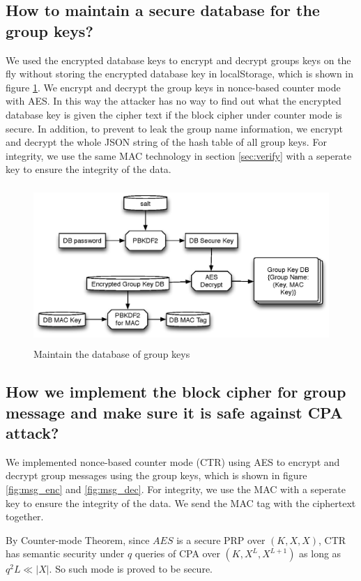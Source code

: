 \subsection{How to maintain a secure database for the group keys?}
We used the encrypted database keys to encrypt and decrypt groups keys on the fly without storing the encrypted database key in localStorage, which is shown in figure \ref{fig:db}. We encrypt and decrypt the group keys in nonce-based counter mode with AES.  In this way the attacker has no way to find out what the encrypted database key is given the cipher text if the block cipher under counter mode is secure. 
In addition, to prevent to leak the group name information, we encrypt and decrypt the whole JSON string of the hash table of all group keys. For integrity, we use the same MAC technology in section \ref{sec:verify} with a seperate key to ensure the integrity of the data.
\begin{figure}[h!]
\centering
\caption{Maintain the database of group keys}
\label{fig:db}
\includegraphics[height=6cm]{fig/db.eps}
\end{figure}

\subsection{How we implement the block cipher for group message and make sure it is safe against CPA attack?}
We implemented nonce-based counter mode (CTR) using AES to encrypt and decrypt group messages using the group keys, which is shown in figure \ref{fig:msg_enc} and \ref{fig:msg_dec}. 
For integrity, we use the MAC with a seperate key to ensure the integrity of the data. We send the MAC tag with the ciphertext together.

By Counter-mode Theorem, since $AES$ is a secure PRP over $(K,X,X)$, CTR has semantic security under $q$ queries of CPA over $(K,X^L,X^{L+1})$ as long as $q^2L \ll |X|$. 
So such mode is proved to be secure.

